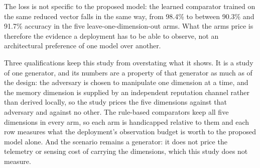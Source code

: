 \documentclass[notspecified,article,submit,moreauthors]{Definitions/mdpi}
\begin{document}
The loss is not specific to the proposed model: the learned comparator trained on the same reduced vector falls in the same way, from 98.4\% to between 90.3\% and 91.7\% accuracy in the five leave-one-dimension-out arms. What the arms price is therefore the evidence a deployment has to be able to observe, not an architectural preference of one model over another.

Three qualifications keep this study from overstating what it shows. It is a study of one generator, and its numbers are a property of that generator as much as of the design: the adversary is chosen to manipulate one dimension at a time, and the memory dimension is supplied by an independent reputation channel rather than derived locally, so the study prices the five dimensions against that adversary and against no other. The rule-based comparators keep all five dimensions in every arm, so each arm is handicapped relative to them and each row measures what the deployment's observation budget is worth to the proposed model alone. And the scenario remains a generator: it does not price the telemetry or sensing cost of carrying the dimensions, which this study does not measure.
\end{document}
